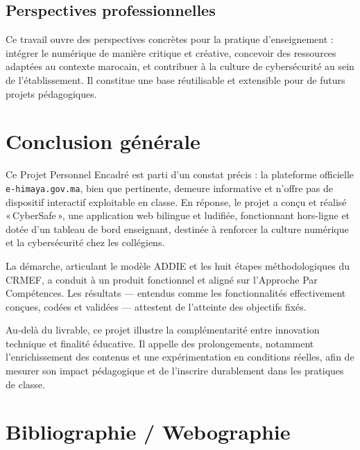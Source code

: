 \documentclass[12pt, a4paper, oneside]{report}
\begin{document}
\section*{Perspectives professionnelles}
Ce travail ouvre des perspectives concrètes pour la pratique d'enseignement : intégrer le numérique de manière critique et créative, concevoir des ressources adaptées au contexte marocain, et contribuer à la culture de cybersécurité au sein de l'établissement. Il constitue une base réutilisable et extensible pour de futurs projets pédagogiques.

\chapter*{Conclusion générale}

Ce Projet Personnel Encadré est parti d'un constat précis : la plateforme officielle \texttt{e-himaya.gov.ma}, bien que pertinente, demeure informative et n'offre pas de dispositif interactif exploitable en classe. En réponse, le projet a conçu et réalisé «\,CyberSafe\,», une application web bilingue et ludifiée, fonctionnant hors-ligne et dotée d'un tableau de bord enseignant, destinée à renforcer la culture numérique et la cybersécurité chez les collégiens.

La démarche, articulant le modèle ADDIE et les huit étapes méthodologiques du CRMEF, a conduit à un produit fonctionnel et aligné sur l'Approche Par Compétences. Les résultats — entendus comme les fonctionnalités effectivement conçues, codées et validées — attestent de l'atteinte des objectifs fixés.

Au-delà du livrable, ce projet illustre la complémentarité entre innovation technique et finalité éducative. Il appelle des prolongements, notamment l'enrichissement des contenus et une expérimentation en conditions réelles, afin de mesurer son impact pédagogique et de l'inscrire durablement dans les pratiques de classe.

\chapter*{Bibliographie / Webographie}
\end{document}
